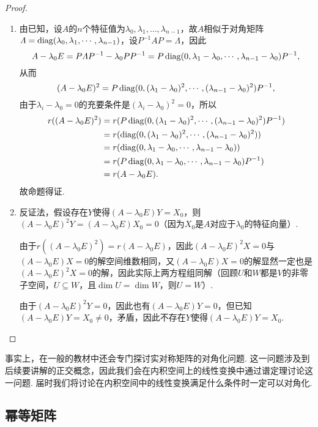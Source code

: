\begin{proof}
    \begin{enumerate}
        \item 由已知，设$A$的$n$个特征值为$\lambda_0,\lambda_1,\ldots,\lambda_{n-1}$，故$A$相似于对角矩阵$\varLambda=\operatorname{diag}(\lambda_0,\lambda_1,\cdots,\lambda_{n-1})$，设$P^{-1}AP=\varLambda$，因此
        \[A-\lambda_0 E=P\varLambda P^{-1}-\lambda_0 PP^{-1}=P\operatorname{diag}(0,\lambda_1-\lambda_0,\cdots,\lambda_{n-1}-\lambda_0)P^{-1},\]
        从而
        \[(A-\lambda_0 E)^2=P\operatorname{diag}(0,(\lambda_1-\lambda_0)^2,\cdots,(\lambda_{n-1}-\lambda_0)^2)P^{-1},\]
        由于$\lambda_i-\lambda_0=0$的充要条件是$(\lambda_i-\lambda_0)^2=0$，所以
        \begin{align*}
            r((A-\lambda_0 E)^2)&=r(P\operatorname{diag}(0,(\lambda_1-\lambda_0)^2,\cdots,(\lambda_{n-1}-\lambda_0)^2)P^{-1})\\
            &=r(\operatorname{diag}(0,(\lambda_1-\lambda_0)^2,\cdots,(\lambda_{n-1}-\lambda_0)^2))\\
            &=r(\operatorname{diag}(0,\lambda_1-\lambda_0,\cdots,\lambda_{n-1}-\lambda_0))\\
            &=r(P\operatorname{diag}(0,\lambda_1-\lambda_0,\cdots,\lambda_{n-1}-\lambda_0)P^{-1})\\
            &=r(A-\lambda_0 E).
        \end{align*}
        故命题得证.

        \item 反证法，假设存在$Y$使得$(A-\lambda_0 E)Y=X_0$，则$(A-\lambda_0 E)^2Y=(A-\lambda_0 E)X_0=0$（因为$X_0$是$A$对应于$\lambda_0$的特征向量）.

        由于$r((A-\lambda_0 E)^2)=r(A-\lambda_0 E)$，因此$(A-\lambda_0 E)^2X=0$与$(A-\lambda_0 E)X=0$的解空间维数相同，又$(A-\lambda_0 E)X=0$的解显然一定也是$(A-\lambda_0 E)^2X=0$的解，因此实际上两方程组同解（回顾$U$和$W$都是$V$的非零子空间，$U\subseteq W$，且$\dim U=\dim W$，则$U=W$）.

        由于$(A-\lambda_0 E)^2Y=0$，因此也有$(A-\lambda_0 E)Y=0$，但已知$(A-\lambda_0 E)Y=X_0\neq 0$，矛盾，因此不存在$Y$使得$(A-\lambda_0 E)Y=X_0$.
    \end{enumerate}
\end{proof}

事实上，在一般的教材中还会专门探讨实对称矩阵的对角化问题. 这一问题涉及到后续要讲解的正交概念，因此我们会在内积空间上的线性变换中通过谱定理讨论这一问题. 届时我们将讨论在内积空间中的线性变换满足什么条件时一定可以对角化.

\subsection{幂等矩阵}

